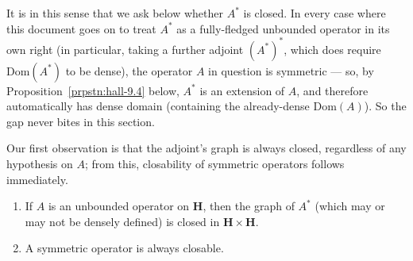 It is in this sense that we ask below whether $A^*$ is closed. In every case where this document goes on to treat $A^*$ as a fully-fledged unbounded operator in its own right (in particular, taking a further adjoint $(A^*)^*$, which does require $\text{Dom}(A^*)$ to be dense), the operator $A$ in question is symmetric — so, by Proposition~\ref{prpstn:hall-9.4} below, $A^*$ is an extension of $A$, and therefore automatically has dense domain (containing the already-dense $\text{Dom}(A)$). So the gap never bites in this section.

Our first observation is that the adjoint's graph is always closed, regardless of any hypothesis on $A$; from this, closability of symmetric operators follows immediately.

\begin{proposition}
    \label{prpstn:hall-9.8}
    \leanok
    \begin{enumerate}
        \item If $A$ is an unbounded operator on $\mathbf{H}$, then the graph of $A^*$ (which may or may not be densely defined) is closed in $\mathbf{H} \times \mathbf{H}$.
        \item A symmetric operator is always closable.
    \end{enumerate}
\end{proposition}
